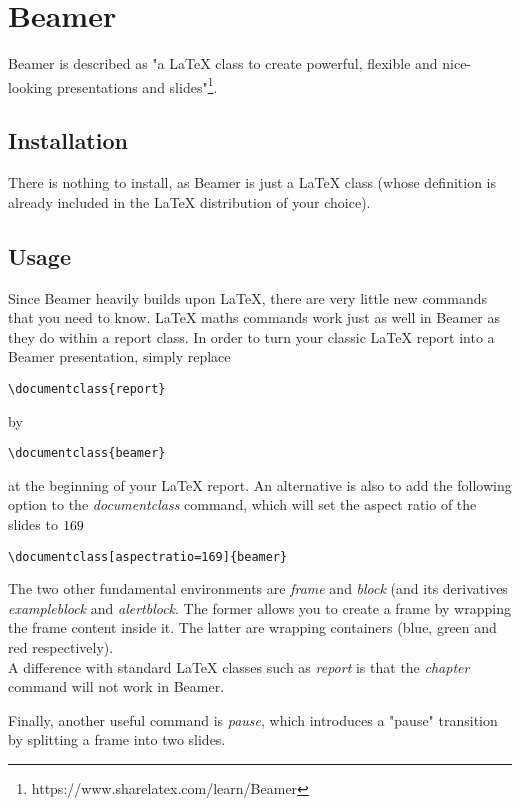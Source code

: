 \section{Beamer}
Beamer is described as "a LaTeX class to create powerful, flexible and nice-looking presentations and slides"\footnote{https://www.sharelatex.com/learn/Beamer}. 
\subsection{Installation}
There is nothing to install, as Beamer is just a LaTeX class (whose definition is already included in the LaTeX distribution of your choice). 
\subsection{Usage}
Since Beamer heavily builds upon LaTeX, there are very little new commands that you need to know. LaTeX maths commands work just as well in Beamer as they do within a report class. In order to turn your classic LaTeX report into a Beamer presentation, 
simply replace
\begin{lstlisting}
\documentclass{report}
\end{lstlisting}

by
\begin{lstlisting}
\documentclass{beamer}
\end{lstlisting}
at the beginning of your LaTeX report.
An alternative is also to add the following option to the \textit{documentclass} command, which will set the aspect ratio of the slides to $16\/9$

\begin{lstlisting}
\documentclass[aspectratio=169]{beamer}
\end{lstlisting}

The two other fundamental environments are \textit{frame} and \textit{block} (and its derivatives \textit{exampleblock} and \textit{alertblock}. The former allows you to create a frame by wrapping the frame content inside it. The latter are wrapping containers (blue, green and red respectively).\\ A difference with standard LaTeX classes such as \textit{report} is that the \textit{chapter} command will not work in Beamer.

Finally, another useful command is \textit{pause}, which introduces a "pause" transition by splitting a frame into two slides.

